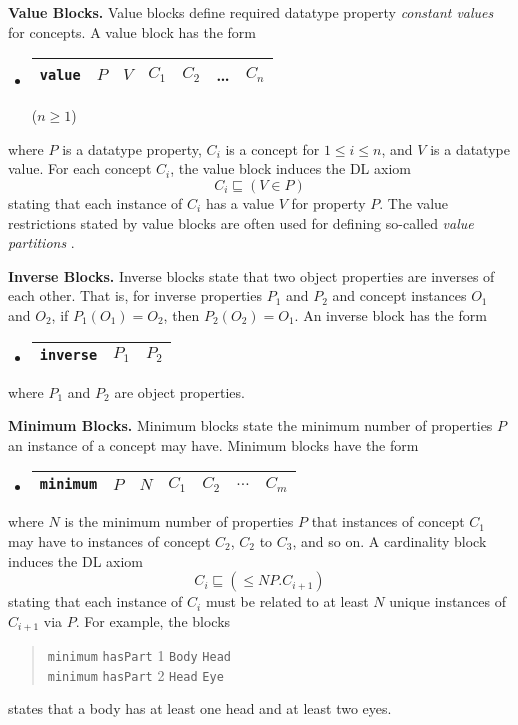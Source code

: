 \documentclass[preprint,number]{elsarticle}
\newcommand{\myblock}[1]{\vspace{12pt}\noindent\textbf{#1}}
\begin{document}
\myblock{Value Blocks.} Value blocks define required datatype property
\emph{constant values} for concepts. A value block has the form
\begin{itemize}
\item[]
  \begin{tabular}{|l|l|l|l|l|l|l|}\hline \texttt{value} & $P$ & $V$ & $C_1$
    & $C_2$ & \dots & $C_n$ \\ \hline
  \end{tabular} \hfill ($n \ge 1$)
\end{itemize}
where $P$ is a datatype property, $C_i$ is a concept for $1 \le i \le
n$, and $V$ is a datatype value. For each concept $C_i$, the value
block induces the DL axiom \[C_i \sqsubseteq (V \in P)\] stating that
each instance of $C_i$ has a value $V$ for property $P$.  The value
restrictions stated by value blocks are often used for defining
so-called \emph{value partitions} \cite{co-ode}.


\myblock{Inverse Blocks.} Inverse blocks state that two object
properties are inverses of each other. That is, for inverse properties
$P_1$ and $P_2$ and concept instances $O_1$ and $O_2$, if $P_1(O_1) =
O_2$, then $P_2(O_2) = O_1$.  An inverse block has the form
\begin{itemize}
\item[]
  \begin{tabular}{|l|l|l|}\hline \texttt{inverse} & $P_1$ & $P_2$
\\ \hline
  \end{tabular}
\end{itemize}
where $P_1$ and $P_2$ are object properties. 

\myblock{Minimum Blocks.} Minimum blocks state the minimum number of
properties $P$ an instance of a concept may have.  Minimum blocks have
the form
\begin{itemize}
\item[]
  \begin{tabular}{|l|l|l|l|l|l|l|}\hline \texttt{minimum} & $P$ & $N$ & 
    $C_1$ & $C_2$ & $\dots$ & $C_m$
    \\ \hline
  \end{tabular}
\end{itemize}
where $N$ is the minimum number of properties $P$ that instances of
concept $C_1$ may have to instances of concept $C_2$, $C_2$ to $C_3$,
and so on. A cardinality block induces the DL axiom \[C_i \sqsubseteq
(\le N P.C_{i+1})\] stating that each instance of $C_i$ must be related to
at least $N$ unique instances of $C_{i+1}$ via $P$. For example, the blocks
\begin{quote}
\texttt{minimum} \texttt{hasPart} 1 \texttt{Body} \texttt{Head} \\
\texttt{minimum} \texttt{hasPart} 2 \texttt{Head} \texttt{Eye}
\end{quote}
states that a body has at least one head and at least two eyes.
\end{document}
